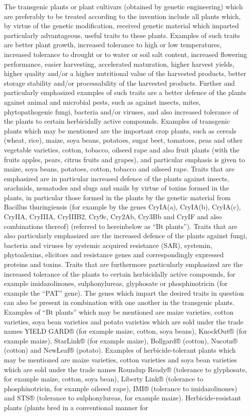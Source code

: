 \documentclass[11pt,a4paper]{article}
\begin{document}
The transgenic plants or plant cultivars (obtained by genetic engineering) which are preferably to be treated according to the invention include all plants which, by virtue of the genetic modification, received genetic material which imparted particularly advantageous, useful traits to these plants. Examples of such traits are better plant growth, increased tolerance to high or low temperatures, increased tolerance to drought or to water or soil salt content, increased flowering performance, easier harvesting, accelerated maturation, higher harvest yields, higher quality and/or a higher nutritional value of the harvested products, better storage stability and/or processability of the harvested products. Further and particularly emphasized examples of such traits are a better defence of the plants against animal and microbial pests, such as against insects, mites, phytopathogenic fungi, bacteria and/or viruses, and also increased tolerance of the plants to certain herbicidally active compounds. Examples of transgenic plants which may be mentioned are the important crop plants, such as cereals (wheat, rice), maize, soya beans, potatoes, sugar beet, tomatoes, peas and other vegetable varieties, cotton, tobacco, oilseed rape and also fruit plants (with the fruits apples, pears, citrus fruits and grapes), and particular emphasis is given to maize, soya beans, potatoes, cotton, tobacco and oilseed rape. Traits that are emphasized are in particular increased defence of the plants against insects, arachnids, nematodes and slugs and snails by virtue of toxins formed in the plants, in particular those formed in the plants by the genetic material from Bacillus thuringiensis (for example by the genes CryIA(a), CryIA(b), CryIA(c), CryIIA, CryIIIA, CryIIIB2, Cry9c, Cry2Ab, Cry3Bb and CryIF and also combinations thereof) (referred to hereinbelow as “Bt plants”). Traits that are also particularly emphasized are the increased defence of the plants against fungi, bacteria and viruses by systemic acquired resistance (SAR), systemin, phytoalexins, elicitors and resistance genes and correspondingly expressed proteins and toxins. Traits that are furthermore particularly emphasized are the increased tolerance of the plants to certain herbicidally active compounds, for example imidazolinones, sulphonylureas, glyphosate or phosphinotricin (for example the “PAT” gene). The genes which impart the desired traits in question can also be present in combination with one another in the transgenic plants. Examples of “Bt plants” which may be mentioned are maize varieties, cotton varieties, soya bean varieties and potato varieties which are sold under the trade names YIELD GARD® (for example maize, cotton, soya beans), KnockOut® (for example maize), StarLink® (for example maize), Bollgard® (cotton), Nucotn® (cotton) and NewLeaf® (potato). Examples of herbicide-tolerant plants which may be mentioned are maize varieties, cotton varieties and soya bean varieties which are sold under the trade names Roundup Ready® (tolerance to glyphosate, for example maize, cotton, soya bean), Liberty Link® (tolerance to phosphinotricin, for example oilseed rape), IMI® (tolerance to imidazolinones) and STS® (tolerance to sulphonylureas, for example maize). Herbicide-resistant plants (plants bred in a conventional manner for 
\end{document}
